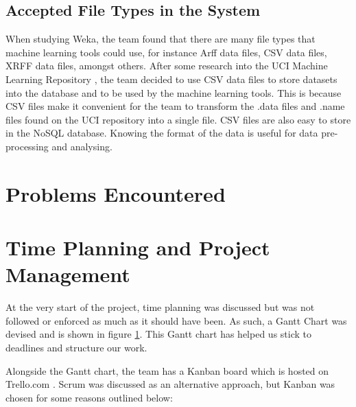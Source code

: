 \documentclass[titlepage]{article}
\begin{document}
\subsection{Accepted File Types in the System}

When studying Weka, the team found that there are many file types that machine learning tools could use, for instance Arff data files, CSV data files, XRFF data files, amongst others. After some research into the UCI Machine Learning Repository \cite{uci}, the team decided to use CSV data files to store datasets into the database and to be used by the machine learning tools. This is because CSV files make it convenient for the team to transform the .data files and .name files found on the UCI repository into a single file. CSV files are also easy to store in the NoSQL database. Knowing the format of the data is useful for data pre-processing and analysing.

\section{Problems Encountered}

\section{Time Planning and Project Management}
At the very start of the project, time planning was discussed but was not followed or enforced as much as it should have been. As such, a Gantt Chart was devised and is shown in figure \ref{ganttchart}. This Gantt chart has helped us stick to deadlines and structure our work.

\begin{figure}\label{ganttchart}
  
\end{figure}

Alongside the Gantt chart, the team has a Kanban board which is hosted on Trello.com \cite{trello}. Scrum was discussed as an alternative approach, but Kanban was chosen for some reasons outlined below:
\end{document}
